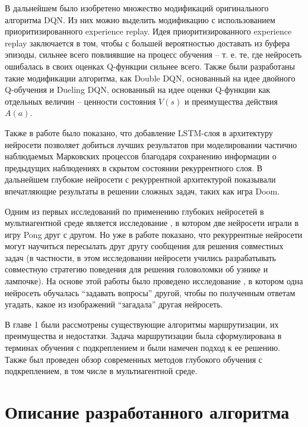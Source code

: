 \documentclass[specification, annotation]{itmo-student-thesis}
\begin{document}
В дальнейшем было изобретено множество модификаций оригинального алгоритма DQN.
Из них можно выделить модификацию с использованием приоритизированного
experience replay\cite{schaul2015prioritized}. Идея приоритизированного
experience replay заключается в том, чтобы с большей вероятностью доставать из
буфера эпизоды, сильнее всего повлиявшие на процесс обучения -- т. е. те,
где нейросеть ошибалась в своих оценках Q-функции сильнее всего.
Также были разработаны такие модификации алгоритма, как Double
DQN\cite{van2016deep}, основанный на идее двойного
Q-обучения\cite{hasselt2010double} и Dueling DQN\cite{wang2015dueling},
основанный на идее оценки Q-функции как отдельных величин -- ценности состояния
$V(s)$ и преимущества действия $A(a)$.

Также в работе \cite{hausknecht2015deep} было показано, что добавление LSTM-слоя
в архитектуру нейросети позволяет добиться лучших результатов при моделировании
частично наблюдаемых Марковских процессов благодаря сохранению информации о
предыдущих наблюдениях в скрытом состоянии рекуррентного слоя. В дальнейшем
глубокие нейросети с рекуррентной архитектурой показывали впечатляющие
результаты в решении сложных задач, таких как игра Doom\cite{lample2016playing}.

Одним из первых исследований по применению глубоких нейросетей в мультиагентной
среде является исследование \cite{tampuu2017multiagent}, в котором две нейросети
играли в игру Pong друг с другом. Но уже в работе \cite{foerster2016learning}
показано, что рекуррентные нейросети могут научиться пересылать друг другу сообщения для решения
совместных задач (в частности, в этом исследовании нейросети учились
разрабатывать совместную стратегию поведения для решения головоломки об узнике и
лампочке). На основе этой работы было проведено исследование
\cite{jorge2016learning}, в котором одна нейросеть обучалась
``задавать вопросы'' другой, чтобы по полученным ответам угадать, какое из
изображений ``загадала'' другая нейросеть.

\chapterconclusion

В главе 1 были рассмотрены существующие алгоритмы маршрутизации, их преимущества
и недостатки. Задача маршрутизации была сформулирована в терминах обучения с
подкреплением и были намечен подход к ее решению. Также был проведен обзор
современных методов глубокого обучения с подкреплением, в том числе в
мультиагентной среде.

\chapter{Описание разработанного алгоритма}
\end{document}

